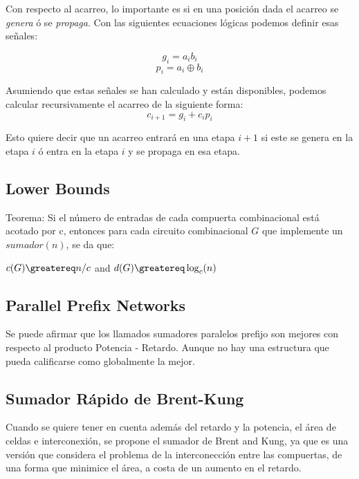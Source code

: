 
Con respecto al acarreo, lo importante es si en una posición dada el acarreo se \emph{genera} ó se \emph{propaga}. Con las siguientes ecuaciones lógicas podemos definir esas señales:
%

$$g_i=a_i  b_i$$
$$p_i=a_i \oplus b_i$$



Asumiendo que estas señales se han calculado y están disponibles, podemos calcular recursivamente el acarreo de la siguiente forma:
$$c_{i+1}=g_i + c_i p_i $$

Esto quiere decir que un acarreo entrará en una etapa \(i+1\) si este se genera en la etapa \(i\) ó entra en la etapa \(i\) y se propaga en esa etapa.

\subsection{Lower Bounds}
Teorema:
Si el número de entradas de cada compuerta combinacional está acotado por c, entonces para cada circuito combinacional \(G\) que implemente un \(sumador(n)\), se da que:

\(c(G) \greatereq n/c \) and \(d(G) \greatereq \log_{c}(n)\)






\subsection{Parallel Prefix Networks}
Se puede afirmar que los llamados sumadores paralelos prefijo son mejores con respecto al producto Potencia - Retardo. Aunque no hay una estructura que pueda calificarse como globalmente la mejor.

\subsection{Sumador Rápido de Brent-Kung}

Cuando se quiere tener en cuenta además del retardo y la potencia, el área de celdas e interconexión, se propone el sumador de Brent and Kung, ya que es una versión que considera el problema de la interconección entre las compuertas, de una forma que minimice el área, a costa de un aumento en el retardo.

